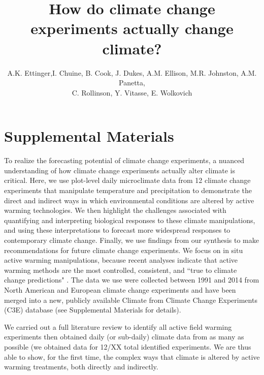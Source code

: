 \documentclass{article}
\begin{document}
 
\title{How do climate change experiments actually change climate?} %

\author{A.K. Ettinger,I. Chuine, B. Cook, J. Dukes, A.M. Ellison, M.R. Johnston, A.M. Panetta,\\ C. Rollinson, Y. Vitasse, E. Wolkovich}
\maketitle  %


\section* {Supplemental Materials}

\par To realize the forecasting potential of climate change experiments, a nuanced understanding of how climate change experiments actually alter climate is critical. Here, we use  plot-level daily  microclimate  data  from  12 climate  change  experiments  that  manipulate temperature and precipitation to demonstrate the direct and indirect ways in which environmental conditions are altered  by active  warming technologies. We then highlight the challenges associated with quantifying and interpreting biological responses to these climate manipulations, and using these interpretations to forecast  more widespread responses to contemporary climate change. Finally,  we use findings from our synthesis to make recommendations for future  climate  change experiments.  We focus on in situ active warming  manipulations, because recent analyses indicate that active warming methods are the most controlled, consistent, and ``true to climate change predictions" \citep{kimball2005,kimball2008,aronson2009,wolkovich2012}. The data we use were collected between 1991 and 2014 from North American and European climate change experiments and  have been merged into a new, publicly  available  Climate from Climate Change Experiments (C3E) database (see Supplemental Materials  for details). 

\par We carried out a full literature review to identify all active field warming experiments then obtained daily (or sub-daily) climate data from as many as possible (we obtained data for 12/XX total identified experiments. We are thus able to show, for the first time, the complex ways that climate is altered by active warming treatments, both directly and indirectly. 
\end{document}
